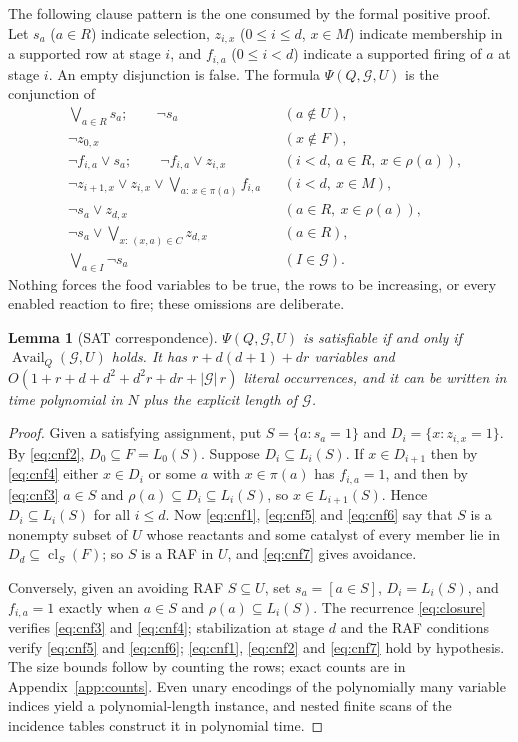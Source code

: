 \documentclass[11pt,a4paper]{article}
\theoremstyle{plain}
\newtheorem{lemma}[theorem]{Lemma}
\theoremstyle{definition}
\theoremstyle{remark}
\newcommand{\cl}{\operatorname{cl}}
\newcommand{\Avail}{\operatorname{Avail}}
\newcommand{\cG}{\mathcal G}
\begin{document}
The following clause pattern is the one consumed by the formal positive proof. Let $s_a$ ($a\in R$) indicate selection, $z_{i,x}$ ($0\le i\le d$, $x\in M$) indicate membership in a supported row at stage $i$, and $f_{i,a}$ ($0\le i<d$) indicate a supported firing of $a$ at stage $i$. An empty disjunction is false. The formula $\Psi(Q,\cG,U)$ is the conjunction of
\begin{align}
 &\textstyle\bigvee_{a\in R}s_a;\qquad \neg s_a &&(a\notin U),\label{eq:cnf1}\\
 &\neg z_{0,x} &&(x\notin F),\label{eq:cnf2}\\
 &\neg f_{i,a}\vee s_a;\qquad \neg f_{i,a}\vee z_{i,x} &&(i<d,\ a\in R,\ x\in\rho(a)),\label{eq:cnf3}\\
 &\textstyle\neg z_{i+1,x}\vee z_{i,x}\vee\bigvee_{a:\,x\in\pi(a)}f_{i,a} &&(i<d,\ x\in M),\label{eq:cnf4}\\
 &\neg s_a\vee z_{d,x} &&(a\in R,\ x\in\rho(a)),\label{eq:cnf5}\\
 &\textstyle\neg s_a\vee\bigvee_{x:\,(x,a)\in C}z_{d,x} &&(a\in R),\label{eq:cnf6}\\
 &\textstyle\bigvee_{a\in I}\neg s_a &&(I\in\cG).\label{eq:cnf7}
\end{align}
Nothing forces the food variables to be true, the rows to be increasing, or every enabled reaction to fire; these omissions are deliberate.

\begin{lemma}[SAT correspondence]\label{lem:cnf}
$\Psi(Q,\cG,U)$ is satisfiable if and only if $\Avail_Q(\cG,U)$ holds. It has $r+d(d+1)+dr$ variables and $O(1+r+d+d^2+d^2r+dr+|\cG|\,r)$ literal occurrences, and it can be written in time polynomial in $N$ plus the explicit length of $\cG$.
\end{lemma}
\begin{proof}
Given a satisfying assignment, put $S=\{a:s_a=1\}$ and $D_i=\{x:z_{i,x}=1\}$. By \eqref{eq:cnf2}, $D_0\subseteq F=L_0(S)$. Suppose $D_i\subseteq L_i(S)$. If $x\in D_{i+1}$ then by \eqref{eq:cnf4} either $x\in D_i$ or some $a$ with $x\in\pi(a)$ has $f_{i,a}=1$, and then by \eqref{eq:cnf3} $a\in S$ and $\rho(a)\subseteq D_i\subseteq L_i(S)$, so $x\in L_{i+1}(S)$. Hence $D_i\subseteq L_i(S)$ for all $i\le d$. Now \eqref{eq:cnf1}, \eqref{eq:cnf5} and \eqref{eq:cnf6} say that $S$ is a nonempty subset of $U$ whose reactants and some catalyst of every member lie in $D_d\subseteq\cl_S(F)$; so $S$ is a RAF in $U$, and \eqref{eq:cnf7} gives avoidance.

Conversely, given an avoiding RAF $S\subseteq U$, set $s_a=[a\in S]$, $D_i=L_i(S)$, and $f_{i,a}=1$ exactly when $a\in S$ and $\rho(a)\subseteq L_i(S)$. The recurrence \eqref{eq:closure} verifies \eqref{eq:cnf3} and \eqref{eq:cnf4}; stabilization at stage $d$ and the RAF conditions verify \eqref{eq:cnf5} and \eqref{eq:cnf6}; \eqref{eq:cnf1}, \eqref{eq:cnf2} and \eqref{eq:cnf7} hold by hypothesis. The size bounds follow by counting the rows; exact counts are in Appendix~\ref{app:counts}. Even unary encodings of the polynomially many variable indices yield a polynomial-length instance, and nested finite scans of the incidence tables construct it in polynomial time.
\end{proof}
\end{document}
